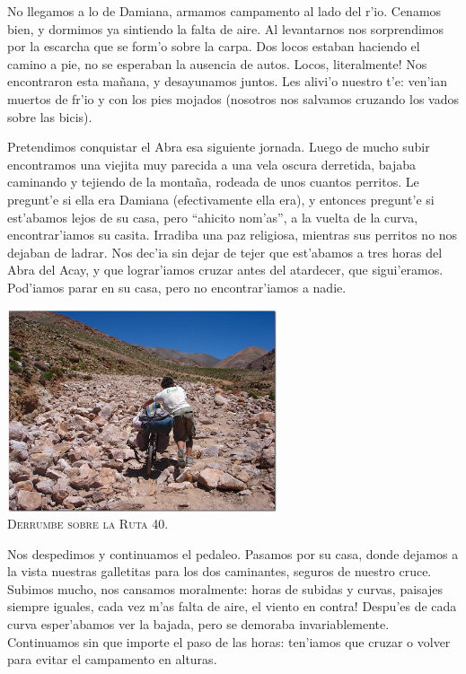 No llegamos a lo de Damiana, armamos campamento al lado del r'io. Cenamos bien,
y dormimos ya sintiendo la falta de aire. Al levantarnos nos sorprendimos por la
escarcha que se form'o sobre la carpa. Dos locos estaban haciendo el camino a
pie, no se esperaban la ausencia de autos. Locos, \textexclamdown literalmente!
Nos encontraron esta ma\~nana, y desayunamos juntos. Les alivi'o nuestro t'e:
ven'ian muertos de fr'io y con los pies mojados (nosotros nos salvamos cruzando
los vados sobre las bicis).

Pretendimos conquistar el Abra esa siguiente jornada. Luego de mucho subir
encontramos una viejita muy parecida a una vela oscura derretida, bajaba
caminando y tejiendo de la monta\~na, rodeada de unos cuantos perritos. Le
pregunt'e si ella era Damiana (efectivamente ella era), y entonces pregunt'e si
est'abamos lejos de su casa, pero ``ahicito nom'as'', a la vuelta de la curva,
encontrar'iamos su casita. Irradiba una paz religiosa, mientras sus perritos no
nos dejaban de ladrar. Nos dec'ia sin dejar de tejer que est'abamos a tres horas
del Abra del Acay, y que lograr'iamos cruzar antes del atardecer, que
sigui'eramos. Pod'iamos parar en su casa, pero no encontrar'iamos a nadie.

\begin{center} \includegraphics[width=300px]{images/DSC0369.jpg}
\textsc{\\Derrumbe sobre la Ruta 40.} \end{center}

Nos despedimos y continuamos el pedaleo. Pasamos por su casa, donde dejamos a la
vista nuestras galletitas para los dos caminantes, seguros de nuestro cruce.
Subimos mucho, nos cansamos moralmente: horas de subidas y curvas, paisajes
siempre iguales, cada vez m'as falta de aire, \textexclamdown el viento en
contra! Despu'es de cada curva esper'abamos ver la bajada, pero se demoraba
invariablemente. Continuamos sin que importe el paso de las horas: ten'iamos que
cruzar o volver para evitar el campamento en alturas.

